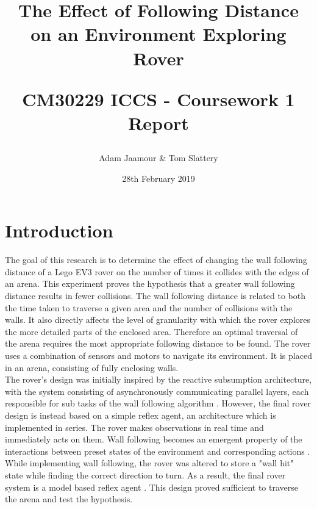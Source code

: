 \documentclass[a4paper,12pt,twocolumn]{article}
\title{
    The Effect of Following Distance on an Environment Exploring Rover\\
    \begin{large}
        CM30229 ICCS - Coursework 1 Report
    \end{large}
}
\author{Adam Jaamour & Tom Slattery}
\date{28th February 2019}
\begin{document}
\maketitle
\thispagestyle{empty}
\clearpage
\setcounter{page}{1}


\section{Introduction}

The goal of this research is to determine the effect of changing the wall following distance of a Lego EV3 rover on the number of times it collides with the edges of an arena. This experiment proves the hypothesis that a greater wall following distance results in fewer collisions. The wall following distance is related to both the time taken to traverse a given area and the number of collisions with the walls. It also directly affects the level of granularity with which the rover explores the more detailed parts of the enclosed area. Therefore an optimal traversal of the arena requires the most appropriate following distance to be found. The rover uses a combination of sensors and motors to navigate its environment. It is placed in an arena, consisting of fully enclosing walls.\\

The rover's design was initially inspired by the reactive subsumption architecture, with the system consisting of asynchronously communicating parallel layers, each responsible for sub tasks of the wall following algorithm \cite{brooks1991intelligence}. However, the final rover design is instead based on a simple reflex agent, an architecture which is implemented in series. The rover makes observations in real time and immediately acts on them. Wall following becomes an emergent property of the interactions between preset states of the environment and corresponding actions \cite{wooldridge2009introduction}. While implementing wall following, the rover was altered to store a "wall hit" state while finding the correct direction to turn. As a result, the final rover system is a model based reflex agent \cite{russell1995artificial}. This design proved sufficient to traverse the arena and test the hypothesis.
\end{document}
